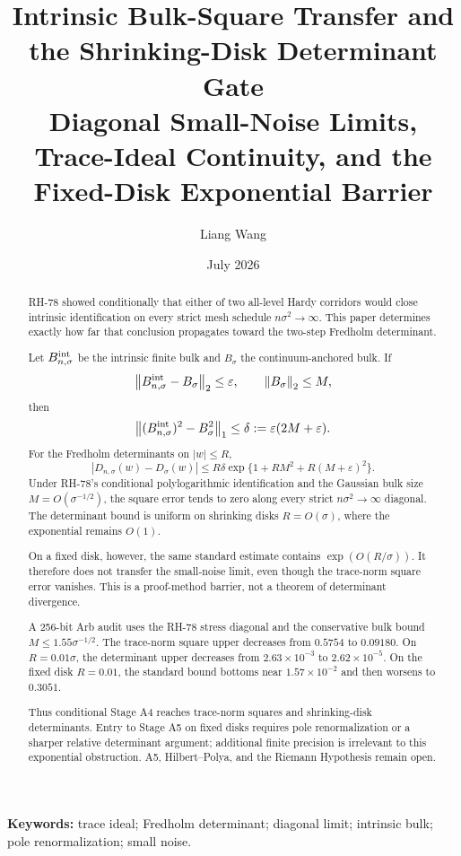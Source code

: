 \documentclass[11pt]{article}
\title{Intrinsic Bulk-Square Transfer and the Shrinking-Disk Determinant Gate\\
\large Diagonal Small-Noise Limits, Trace-Ideal Continuity, and the Fixed-Disk Exponential Barrier}
\author{Liang Wang}
\date{July 2026}
\newcommand{\norm}[1]{\left\lVert#1\right\rVert}
\begin{document}
\maketitle

\begin{abstract}
RH-78 showed conditionally that either of two all-level Hardy corridors would
close intrinsic identification on every strict mesh schedule
$n\sigma^2\to\infty$.  This paper determines exactly how far that conclusion
propagates toward the two-step Fredholm determinant.

Let $B^{\rm int}_{n,\sigma}$ be the intrinsic finite bulk and
$B_\sigma$ the continuum-anchored bulk.  If
\[
 \norm{B^{\rm int}_{n,\sigma}-B_\sigma}_2\le\varepsilon,
 \qquad \norm{B_\sigma}_2\le M,
\]
then
\[
 \norm{(B^{\rm int}_{n,\sigma})^2-B_\sigma^2}_1
 \le\delta:=\varepsilon(2M+\varepsilon).
\]
For the Fredholm determinants on $|w|\le R$,
\[
 |D_{n,\sigma}(w)-D_\sigma(w)|
 \le R\delta\exp\{1+RM^2+R(M+\varepsilon)^2\}.
\]
Under RH-78's conditional polylogarithmic identification and the Gaussian
bulk size $M=O(\sigma^{-1/2})$, the square error tends to zero along every
strict $n\sigma^2\to\infty$ diagonal.  The determinant bound is uniform on
shrinking disks $R=O(\sigma)$, where the exponential remains $O(1)$.

On a fixed disk, however, the same standard estimate contains
$\exp(O(R/\sigma))$.  It therefore does not transfer the small-noise limit,
even though the trace-norm square error vanishes.  This is a proof-method barrier,
not a theorem of determinant divergence.

A 256-bit Arb audit uses the RH-78 stress diagonal and the conservative bulk
bound $M\le1.55\sigma^{-1/2}$.  The trace-norm square upper decreases from
$0.5754$ to $0.09180$.  On $R=0.01\sigma$, the determinant upper decreases
from $2.63\times10^{-3}$ to $2.62\times10^{-5}$.  On the fixed disk
$R=0.01$, the standard bound bottoms near $1.57\times10^{-2}$ and then
worsens to $0.3051$.

Thus conditional Stage A4 reaches trace-norm squares and shrinking-disk
determinants.  Entry to Stage A5 on fixed disks requires pole renormalization
or a sharper relative determinant argument; additional finite precision is
irrelevant to this exponential obstruction.  A5, Hilbert--Polya, and the
Riemann Hypothesis remain open.
\end{abstract}

\noindent\textbf{Keywords:} trace ideal; Fredholm determinant; diagonal
limit; intrinsic bulk; pole renormalization; small noise.
\end{document}
